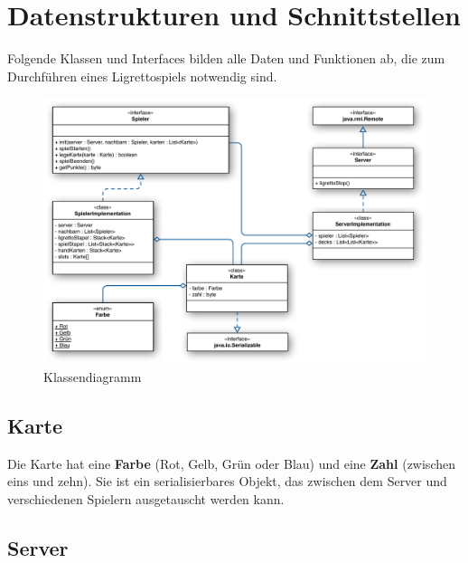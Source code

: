 \section{Datenstrukturen und Schnittstellen} 

Folgende Klassen und Interfaces bilden alle Daten und Funktionen ab, die zum Durchführen eines Ligrettospiels notwendig sind.



\begin{figure}[H]
	\includegraphics[width=1.0\textwidth,angle=0]{graphics/klassendiagramm.pdf}
	\caption{Klassendiagramm \hfill{} }
\end{figure}


\subsection{Karte}

Die Karte hat eine {\bf Farbe} (Rot, Gelb, Grün oder Blau) und eine {\bf Zahl} (zwischen eins und zehn). Sie ist ein serialisierbares Objekt, das zwischen dem Server und verschiedenen Spielern ausgetauscht werden kann.




\subsection{Server}

